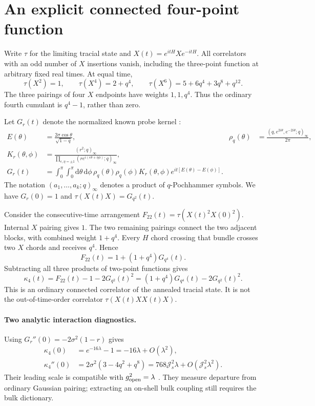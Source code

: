 \documentclass[11pt,a4paper]{article}
\newcommand{\Js}{\mathcal J_s}
\newcommand{\dd}{\mathrm d}
\begin{document}
\newpage
\section{An explicit connected four-point function}
Write $\tau$ for the limiting tracial state and
$X(t)=e^{itH}Xe^{-itH}$. All correlators with an odd number of $X$
insertions vanish, including the three-point function at arbitrary fixed
real times. At equal time,
\begin{equation}
 \tau(X^2)=1,\qquad\tau(X^4)=2+q^4,\qquad
 \tau(X^6)=5+6q^4+3q^8+q^{12}.
\end{equation}
The three pairings of four $X$ endpoints have weights $1,1,q^4$.
Thus the ordinary fourth cumulant is $q^4-1$, rather than zero.

Let $G_r(t)$ denote the normalized known probe kernel \cite{bint,bnr}:
\begin{align}
 E(\theta)&=\frac{2\sigma\cos\theta}{\sqrt{1-q}},&
 \rho_q(\theta)&=\frac{(q,e^{2i\theta},e^{-2i\theta};q)_\infty}{2\pi},\\
 K_r(\theta,\phi)&=\frac{(r^2;q)_\infty}
 {\prod_{\epsilon,\eta=\pm1}(r e^{i(\epsilon\theta+\eta\phi)};q)_\infty},\\
 G_r(t)&=\int_0^\pi\!\int_0^\pi \dd\theta\,\dd\phi\,
 \rho_q(\theta)\rho_q(\phi)K_r(\theta,\phi)
 e^{it[E(\theta)-E(\phi)]}.\label{mehler}
\end{align}
The notation $(a_1,\ldots,a_k;q)_\infty$ denotes a product of
$q$-Pochhammer symbols. We have $G_r(0)=1$ and $\tau(X(t)X)=G_{q^2}(t)$.

Consider the consecutive-time arrangement
$F_{22}(t)=\tau(X(t)^2X(0)^2)$. Internal $X$ pairing gives $1$.
The two remaining pairings connect the two adjacent blocks, with combined
weight $1+q^4$. Every $H$ chord crossing that bundle crosses two $X$
chords and receives $q^4$. Hence
\begin{equation}\boxed{
 F_{22}(t)=1+(1+q^4)G_{q^4}(t).}\label{f22}
\end{equation}
Subtracting all three products of two-point functions gives
\begin{equation}\boxed{
 \kappa_4(t)=F_{22}(t)-1-2G_{q^2}(t)^2
 =(1+q^4)G_{q^4}(t)-2G_{q^2}(t)^2.}\label{kappa}
\end{equation}
This is an ordinary connected correlator of the annealed tracial state.
It is not the out-of-time-order correlator $\tau(X(t)XX(t)X)$.

\paragraph{Two analytic interaction diagnostics.}
Using $G_r''(0)=-2\sigma^2(1-r)$ gives
\begin{align}
 \kappa_4(0)&=e^{-16\lambda}-1=-16\lambda+O(\lambda^2),\\
 \kappa_4''(0)&=2\sigma^2(3-4q^2+q^8)
 =768\Js^2\lambda+O(\Js^2\lambda^2).
\end{align}
Their leading scale is compatible with $g_{\rm open}^2=\lambda$
\cite{correction}. They measure departure from ordinary Gaussian pairing;
extracting an on-shell bulk coupling still requires the bulk dictionary.
\end{document}
